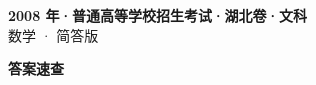 \documentclass[zihao=-4, a4paper]{ctexart}
\begin{document}
\begin{center}
  {\Large\bfseries 2008 年·普通高等学校招生考试·湖北卷·文科}\\[4pt]
  {\large 数学 · 简答版}
\end{center}
\medskip
{}

\clearpage
{}
\begin{center}{\Large\bfseries 答案速查}\end{center}
\medskip

\end{document}

